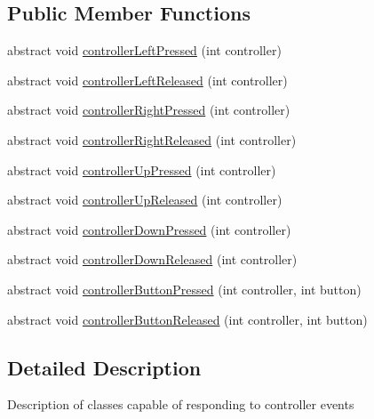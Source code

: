\subsection*{Public Member Functions}
\begin{DoxyCompactItemize}
\item 
abstract void \mbox{\hyperlink{interfaceorg_1_1newdawn_1_1slick_1_1_controller_listener_abfb38c5d8e44b7613a49cbfaf19d5585}{controller\+Left\+Pressed}} (int controller)
\item 
abstract void \mbox{\hyperlink{interfaceorg_1_1newdawn_1_1slick_1_1_controller_listener_ad2f898f0efe21771a0d9568c454dea0d}{controller\+Left\+Released}} (int controller)
\item 
abstract void \mbox{\hyperlink{interfaceorg_1_1newdawn_1_1slick_1_1_controller_listener_ae4ac64996df9778c4987705275792780}{controller\+Right\+Pressed}} (int controller)
\item 
abstract void \mbox{\hyperlink{interfaceorg_1_1newdawn_1_1slick_1_1_controller_listener_a33ee418e010e69783169b3f52fb62c3b}{controller\+Right\+Released}} (int controller)
\item 
abstract void \mbox{\hyperlink{interfaceorg_1_1newdawn_1_1slick_1_1_controller_listener_a7cb917761de1e555b23469042b6f1e03}{controller\+Up\+Pressed}} (int controller)
\item 
abstract void \mbox{\hyperlink{interfaceorg_1_1newdawn_1_1slick_1_1_controller_listener_a1342ad9ad1f7314b4eb10c20c21a9d50}{controller\+Up\+Released}} (int controller)
\item 
abstract void \mbox{\hyperlink{interfaceorg_1_1newdawn_1_1slick_1_1_controller_listener_a9c619e7cb29b3c8b68bc24f9a4e238d7}{controller\+Down\+Pressed}} (int controller)
\item 
abstract void \mbox{\hyperlink{interfaceorg_1_1newdawn_1_1slick_1_1_controller_listener_a7d0ca99c8cd5b0d332bece1d17befee7}{controller\+Down\+Released}} (int controller)
\item 
abstract void \mbox{\hyperlink{interfaceorg_1_1newdawn_1_1slick_1_1_controller_listener_ae6feac165a8d0eded01f38de12f239ff}{controller\+Button\+Pressed}} (int controller, int button)
\item 
abstract void \mbox{\hyperlink{interfaceorg_1_1newdawn_1_1slick_1_1_controller_listener_a34020453a6c40e12b149c334a4adc246}{controller\+Button\+Released}} (int controller, int button)
\end{DoxyCompactItemize}


\subsection{Detailed Description}
Description of classes capable of responding to controller events

